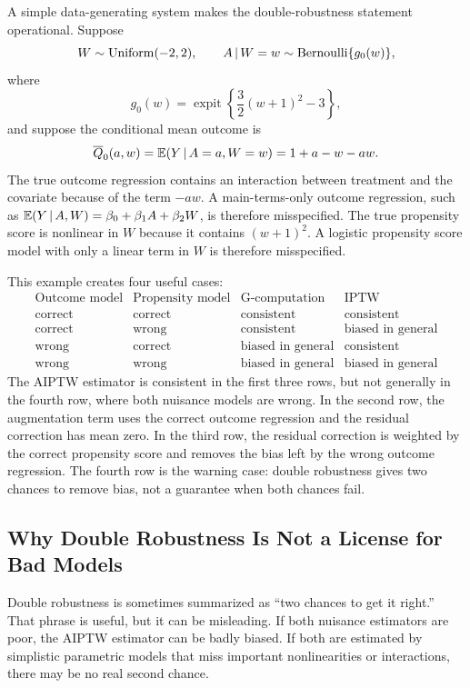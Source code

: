 A simple data-generating system makes the double-robustness statement
operational. Suppose
\[
  W\sim \operatorname{Uniform}(-2,2),
  \qquad
  A\,\vert\, W=w\sim \operatorname{Bernoulli}\{g_0(w)\},
\]
where
\[
  g_0(w)=\operatorname{expit}\left\{\frac{3}{2}(w+1)^2-3\right\},
\]
and suppose the conditional mean outcome is
\[
  \overline{Q}_0(a,w)=\mathbb{E}(Y\,\vert\, A=a,W=w)=1+a-w-aw.
\]
The true outcome regression contains an interaction between treatment and the
covariate because of the term $-aw$. A main-terms-only outcome regression, such
as $\mathbb{E}(Y\,\vert\, A,W)=\beta_0+\beta_1A+\beta_2W$, is therefore misspecified. The
true propensity score is nonlinear in $W$ because it contains $(w+1)^2$. A
logistic propensity score model with only a linear term in $W$ is therefore
misspecified.

This example creates four useful cases:
\[
\begin{array}{c|c|c|c}
\text{Outcome model} & \text{Propensity model} & \text{G-computation}
& \text{IPTW}\\
\hline
\text{correct} & \text{correct} & \text{consistent} & \text{consistent}\\
\text{correct} & \text{wrong} & \text{consistent} & \text{biased in general}\\
\text{wrong} & \text{correct} & \text{biased in general} & \text{consistent}\\
\text{wrong} & \text{wrong} & \text{biased in general} & \text{biased in general}
\end{array}
\]
The AIPTW estimator is consistent in the first three rows, but not generally in
the fourth row, where both nuisance models are wrong. In the second row, the augmentation term uses
the correct outcome regression and the residual correction has mean zero. In the
third row, the residual correction is weighted by the correct propensity score
and removes the bias left by the wrong outcome regression. The fourth row is the
warning case: double robustness gives two chances to remove bias, not a
guarantee when both chances fail.

\subsection{Why Double Robustness Is Not a License for Bad Models}

Double robustness is sometimes summarized as ``two chances to get it right.'' That
phrase is useful, but it can be misleading. If both nuisance estimators are poor, the
AIPTW estimator can be badly biased. If both are estimated by simplistic parametric
models that miss important nonlinearities or interactions, there may be no real second
chance.

